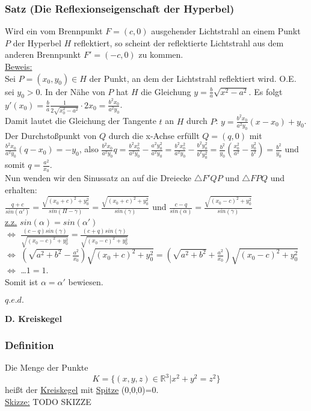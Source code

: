 \documentclass[a4paper]{article}
\newcommand{\ul}{\underline}
\renewcommand{\proof}{\ul{Beweis:}\\}
\renewcommand{\qed}{\begin{flushright}
\ul{\(q.e.d.\)}
\end{flushright}}
\begin{document}
\subsubsection{Satz (Die Reflexionseigenschaft der Hyperbel)}
Wird ein vom Brennpunkt \(F=(c,0)\) ausgehender Lichtstrahl an einem Punkt \(P\) der Hyperbel \(H\) reflektiert, so scheint der reflektierte Lichtstrahl aus dem anderen Brennpunkt \(F'=(-c,0)\) zu kommen.\\
\proof
Sei \(P=(x_0,y_0)\in H\) der Punkt, an dem der Lichtstrahl reflektiert wird. O.E. sei \(y_0>0\). In der Nähe von \(P\) hat \(H\) die Gleichung \(y=\frac{b}{a}\sqrt{x^2-a^2}\). Es folgt \(y'(x_0)=\frac{b}{a}\frac{1}{2\sqrt{x_0^2-a^2}}\cdot 2x_0=\frac{b^2x_0}{a^2y_0}\).\\
Damit lautet die Gleichung der Tangente \(t\) an \(H\) durch \(P\): \(y=\frac{b^2x_0}{a^2y_0}(x-x_0)+y_0\). Der Durchstoßpunkt von \(Q\) durch die x-Achse erfüllt \(Q=(q,0)\) mit \(\frac{b^2x_0}{a^2y_0}(q-x_0)=-y_0\), also \(\frac{b^2x_0}{a^2y_0}q=\frac{b^2x_0^2}{a^2y_0}-\frac{a^2y_0^2}{a^2y_0}=\frac{b^2x_0^2}{a^2y_0}-\frac{b^2y_0^2}{b^2y_0^2}=\frac{b^2}{y_0}(\frac{x_0^2}{a^2}-\frac{y_0^2}{b^2})=\frac{b^2}{y_0}\) und somit \(q=\frac{a^2}{x_0}\).\\
Nun wenden wir den Sinussatz an auf die Dreiecke \(\triangle F'QP\) und \(\triangle FPQ\) und erhalten:\\
\(\frac{q+c}{sin(\alpha')}=\frac{\sqrt{(x_0+c)^2+y_0^2}}{sin(\Pi - \gamma)}=\frac{\sqrt{(x_0+c)^2+y_0^2}}{sin(\gamma)}\) und \(\frac{c-q}{sin(\alpha)}=\frac{\sqrt{(x_0-c)^2+y_0^2}}{sin(\gamma)}\)\\
\ul{z.z.} \(sin(\alpha)=sin(\alpha')\)\\
\(\Leftrightarrow\) \(\frac{(c-q)sin(\gamma)}{\sqrt{(x_0-c)^2+y_0^2}}=\frac{(c+q)sin(\gamma)}{\sqrt{(x_0-c)^2+y_0^2}}\)\\
\(\Leftrightarrow\) \((\sqrt{a^2+b^2}-\frac{a^2}{x_0})\sqrt{(x_0+c)^2+y_0^2}=(\sqrt{a^2+b^2}+\frac{a^2}{x_0})\sqrt{(x_0-c)^2+y_0^2}\)\\
\(\Leftrightarrow\) \dots \(1=1\).\\
Somit ist \(\alpha=\alpha'\) bewiesen.
\qed
{}
\textbf{D. Kreiskegel}
\subsubsection{Definition}
Die Menge der Punkte
$$K=\{(x,y,z)\in\mathbb{R}^3|x^2+y^2=z^2\}$$
heißt der \ul{Kreiskegel} mit \ul{Spitze} (0,0,0)=0.\\
\ul{Skizze:} TODO SKIZZE\\
\end{document}
